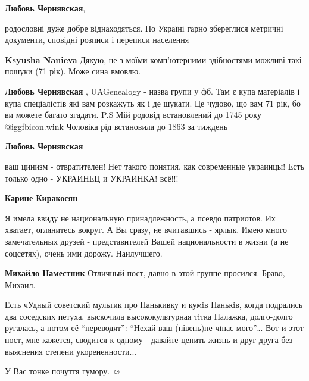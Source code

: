 \begin{itemize}
\begin{itemize}
\textbf{Любовь Чернявская}, 

родословні дуже добре віднаходяться. По Україні гарно збереглися метричні
документи, сповідні розписи і переписи населення

\begin{itemize} %
\textbf{Ksyusha Nanieva} Дякую, не з моїми комп'ютерними здібностями можливі такі пошуки (71 рік). Може сина вмовлю.

\textbf{Любовь Чернявская} , UAGenealogy - назва групи у фб. Там є купа матеріалів і купа спеціалістів які вам розкажуть як і де шукати. Це чудово, що вам 71 рік, бо ви можете багато згадати. P.S Мій родовід встановлений до 1745 року  @igg{fbicon.wink}  Чоловіка рід встановила до 1863 за тиждень
\end{itemize} %

\textbf{Любовь Чернявская} 

ваш цинизм - отвратителен! Нет такого понятия, как современные украинцы! Есть
только одно - УКРАИНЕЦ и УКРАИНКА! всё!!!

\begin{itemize} %
\textbf{Карине Киракосян} 

Я имела ввиду не национальную принадлежность, а псевдо патриотов. Их хватает,
оглянитесь вокруг. А Вы сразу, не вчитавшись - ярлык. Имею много замечательных
друзей - представителей Вашей национальности в жизни (а не соцсетях), очень ими
дорожу. Наилучшего.

\end{itemize} %

\textbf{Михайло Наместник} Отличный пост, давно в этой группе просился. Браво, Михаил.

\end{itemize} %


Есть чУдный советский мультик про Панькивку и кумiв Панькiв, когда подрались два
соседских петуха, выскочила высококультурная тiтка Палажка, долго-долго
ругалась, а потом её \enquote{переводят}: \enquote{Нехай ваш (півень)не чiпає
мого}... Вот и этот пост, мне кажется, сводится к одному - давайте ценить жизнь
и друг друга без выяснения степени укорененности...

У Вас тонке почуття гумору.  ☺ ️ 



\end{itemize}
